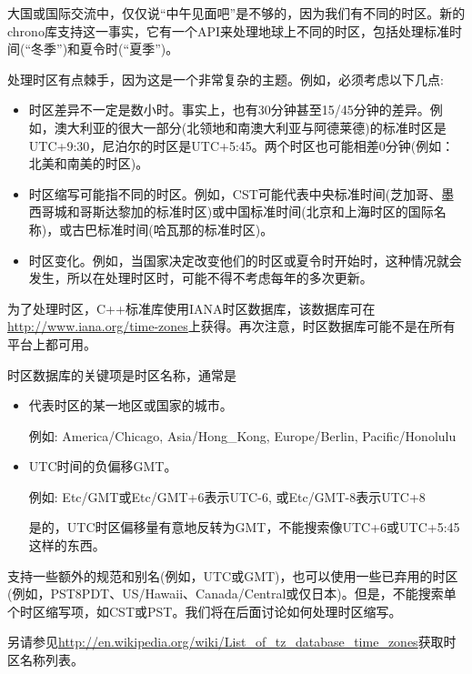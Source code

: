 

大国或国际交流中，仅仅说“中午见面吧”是不够的，因为我们有不同的时区。新的chrono库支持这一事实，它有一个API来处理地球上不同的时区，包括处理标准时间(“冬季”)和夏令时(“夏季”)。


处理时区有点棘手，因为这是一个非常复杂的主题。例如，必须考虑以下几点:

\begin{itemize}
\item 
时区差异不一定是数小时。事实上，也有30分钟甚至15/45分钟的差异。例如，澳大利亚的很大一部分(北领地和南澳大利亚与阿德莱德)的标准时区是UTC+9:30，尼泊尔的时区是UTC+5:45。两个时区也可能相差0分钟(例如：北美和南美的时区)。

\item 
时区缩写可能指不同的时区。例如，CST可能代表中央标准时间(芝加哥、墨西哥城和哥斯达黎加的标准时区)或中国标准时间(北京和上海时区的国际名称)，或古巴标准时间(哈瓦那的标准时区)。

\item 
时区变化。例如，当国家决定改变他们的时区或夏令时开始时，这种情况就会发生，所以在处理时区时，可能不得不考虑每年的多次更新。
\end{itemize}


为了处理时区，C++标准库使用IANA时区数据库，该数据库可在\url{http://www.iana.org/time-zones}上获得。再次注意，时区数据库可能不是在所有平台上都可用。

时区数据库的关键项是时区名称，通常是

\begin{itemize}
\item 
代表时区的某一地区或国家的城市。

例如: America/Chicago, Asia/Hong\_Kong, Europe/Berlin, Pacific/Honolulu

\item 
UTC时间的负偏移GMT。

例如: Etc/GMT或Etc/GMT+6表示UTC-6, 或Etc/GMT-8表示UTC+8 

是的，UTC时区偏移量有意地反转为GMT，不能搜索像UTC+6或UTC+5:45这样的东西。
\end{itemize}

支持一些额外的规范和别名(例如，UTC或GMT)，也可以使用一些已弃用的时区(例如，PST8PDT、US/Hawaii、Canada/Central或仅日本)。但是，不能搜索单个时区缩写项，如CST或PST。我们将在后面讨论如何处理时区缩写。

另请参见\url{http://en.wikipedia.org/wiki/List_of_tz_database_time_zones}获取时区名称列表。

